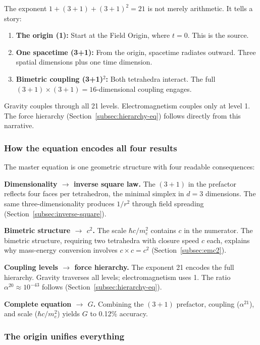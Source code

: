 \documentclass[aps,prd,preprint,superscriptaddress,showpacs,preprintnumbers,amsmath,amssymb,nofootinbib]{revtex4-2}
\begin{document}
The exponent $1 + (3+1) + (3+1)^2 = 21$ is not merely arithmetic. It tells a story:

\begin{enumerate}
\item \textbf{The origin (1):} Start at the Field Origin, where $t = 0$. This is the source.
\item \textbf{One spacetime (3+1):} From the origin, spacetime radiates outward. Three spatial dimensions plus one time dimension.
\item \textbf{Bimetric coupling (3+1)$^2$:} Both tetrahedra interact. The full $(3+1) \times (3+1) = 16$-dimensional coupling engages.
\end{enumerate}

Gravity couples through all 21 levels. Electromagnetism couples only at level 1. The force hierarchy (Section~\ref{subsec:hierarchy-eq}) follows directly from this narrative.

\subsubsection*{How the equation encodes all four results}

The master equation is one geometric structure with four readable consequences:

\textbf{Dimensionality $\rightarrow$ inverse square law.} The $(3+1)$ in the prefactor reflects four faces per tetrahedron, the minimal simplex in $d = 3$ dimensions. The same three-dimensionality produces $1/r^2$ through field spreading (Section~\ref{subsec:inverse-square}).

\textbf{Bimetric structure $\rightarrow$ $c^2$.} The scale $\hbar c/m_e^2$ contains $c$ in the numerator. The bimetric structure, requiring two tetrahedra with closure speed $c$ each, explains why mass-energy conversion involves $c \times c = c^2$ (Section~\ref{subsec:emc2}).

\textbf{Coupling levels $\rightarrow$ force hierarchy.} The exponent 21 encodes the full hierarchy. Gravity traverses all levels; electromagnetism uses 1. The ratio $\alpha^{20} \approx 10^{-43}$ follows (Section~\ref{subsec:hierarchy-eq}).

\textbf{Complete equation $\rightarrow$ $G$.} Combining the $(3+1)$ prefactor, coupling ($\alpha^{21}$), and scale ($\hbar c/m_e^2$) yields $G$ to 0.12\% accuracy.

\subsubsection*{The origin unifies everything}
\end{document}
